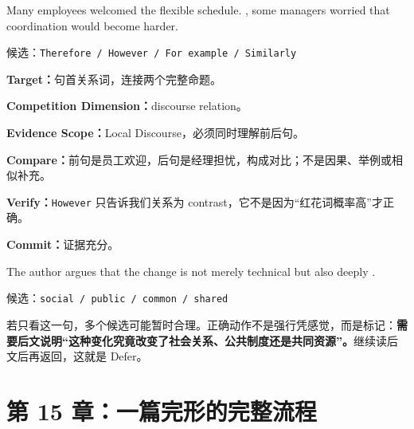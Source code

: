 \documentclass[11pt,a4paper]{ctexart}
\newcommand{\kw}[1]{\textbf{#1}}
\begin{document}
\begin{eng}
Many employees welcomed the flexible schedule. \underline{\hspace{1.1cm}}, some managers worried that coordination would become harder.

候选：\texttt{Therefore / However / For example / Similarly}
\end{eng}
\kw{Target：}句首关系词，连接两个完整命题。\par
\kw{Competition Dimension：}discourse relation。\par
\kw{Evidence Scope：}Local Discourse，必须同时理解前后句。\par
\kw{Compare：}前句是员工欢迎，后句是经理担忧，构成对比；不是因果、举例或相似补充。\par
\kw{Verify：}\texttt{However} 只告诉我们关系为 contrast，它不是因为“红花词概率高”才正确。\par
\kw{Commit：}证据充分。

\begin{eng}
The author argues that the change is not merely technical but also deeply \underline{\hspace{1.1cm}}.

候选：\texttt{social / public / common / shared}
\end{eng}
若只看这一句，多个候选可能暂时合理。正确动作不是强行凭感觉，而是标记：\kw{需要后文说明“这种变化究竟改变了社会关系、公共制度还是共同资源”。}继续读后文后再返回，这就是 Defer。

\newpage
\section{第 15 章：一篇完形的完整流程}
\end{document}
